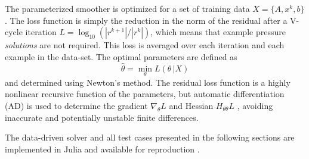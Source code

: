 \documentclass[review]{elsarticle}
\begin{document}
The parameterized smoother is optimized for a set of training data $X=\{A,x^k,b\}$. The loss function is simply the reduction in the norm of the residual after a V-cycle iteration $L = \log_{10}(|r^{k+1}| / |r^{k}|)$, which means that example pressure \textit{solutions} are not required. This loss is averaged over each iteration and each example in the data-set. The optimal parameters are defined as
\begin{equation}
    \hat\theta = \min_\theta L(\theta\, |X)
\end{equation}
and determined using Newton's method. The residual loss function is a highly nonlinear recursive function of the parameters, but automatic differentiation (AD) is used to determine the gradient $\nabla_\theta L$ and Hessian $H_{\theta\theta} L$ \cite{RevelsLubinPapamarkou2016}, avoiding inaccurate and potentially unstable finite differences.

The data-driven solver and all test cases presented in the following sections are implemented in Julia and available for reproduction \cite{bezanson2017julia,weymouth2021julia}.
\end{document}

